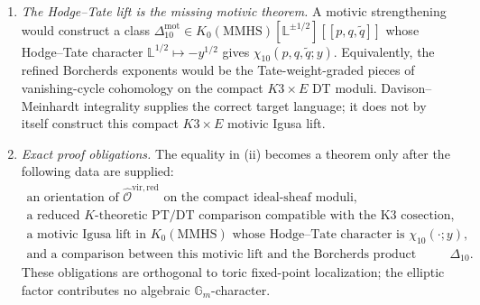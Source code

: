 \begin{proposition}
\begin{enumerate}[label=\textup{(\roman*)}]
\[
 \chi_{10}(p, q, \tilde q; y)
 =
 \mathrm{Lift}\!\left(\phi_{0,1}^{\mathrm{ref}}\right)^{2},
\]
with
\[
 \phi_{0,1}^{\mathrm{ref}}(\tau,z;y)
 =
 \phi_{0,1}(\tau,z)-(y-2+y^{-1})\phi_{-2,1}(\tau,z).
\]
At \(y=1\) this implication reduces to the primitive numerical
Oberdieck--Pixton Igusa scalar together with the reduced DT/PT
comparison. The all-class version is the Oberdieck--Pandharipande
multiple-cover problem, not a consequence of the primitive theorem.
\item \emph{The Hodge--Tate lift is the missing motivic theorem.} A
motivic strengthening would construct a class
\(\Delta_{10}^{\mathrm{mot}}\in
K_0(\mathrm{MMHS})[\mathbb L^{\pm1/2}][\![p,q,\tilde q]\!]\) whose
Hodge--Tate character \(\mathbb L^{1/2}\mapsto -y^{1/2}\) gives
\(\chi_{10}(p,q,\tilde q;y)\). Equivalently, the refined Borcherds
exponents would be the Tate-weight-graded pieces of vanishing-cycle
cohomology on the compact \(K3\times E\) DT moduli. Davison--Meinhardt
integrality supplies the correct target language; it does not by itself
construct this compact \(K3\times E\) motivic Igusa lift.
\item \emph{Exact proof obligations.} The equality in \textup{(ii)}
becomes a theorem only after the following data are supplied:
\[
\begin{gathered}
\text{an orientation of }\widehat{\mathcal O}^{\mathrm{vir,red}}
\text{ on the compact ideal-sheaf moduli,}\\
\text{a reduced \(K\)-theoretic PT/DT comparison compatible with the
K3 cosection,}\\
\text{a motivic Igusa lift in }K_0(\mathrm{MMHS})
\text{ whose Hodge--Tate character is }\chi_{10}(\cdot;y),\\
\text{and a comparison between this motivic lift and the Borcherds
product normalisation of }\Delta_{10}.
\end{gathered}
\]
These obligations are orthogonal to toric fixed-point localization; the
elliptic factor contributes no algebraic \(\mathbb G_m\)-character.
\end{enumerate}
\end{proposition}

